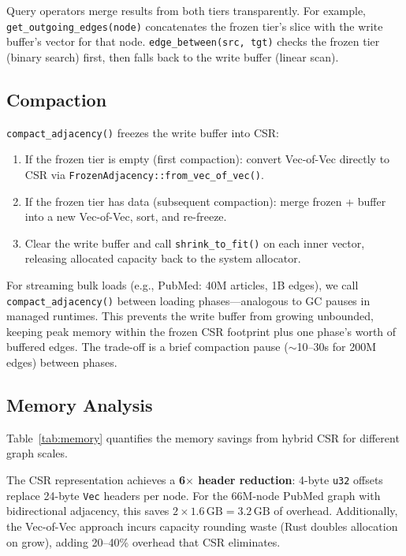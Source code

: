 \documentclass[sigconf, nonacm]{acmart}
\begin{document}
\noindent
Query operators merge results from both tiers transparently.
For example, \texttt{get\_outgoing\_edges(node)} concatenates the frozen tier's slice with the write buffer's vector for that node.
\texttt{edge\_between(src, tgt)} checks the frozen tier (binary search) first, then falls back to the write buffer (linear scan).

\subsection{Compaction}

\texttt{compact\_adjacency()} freezes the write buffer into CSR:

\begin{enumerate}[leftmargin=*]
  \item If the frozen tier is empty (first compaction): convert Vec-of-Vec directly to CSR via \texttt{FrozenAdjacency::from\_vec\_of\_vec()}.
  \item If the frozen tier has data (subsequent compaction): merge frozen + buffer into a new Vec-of-Vec, sort, and re-freeze.
  \item Clear the write buffer and call \texttt{shrink\_to\_fit()} on each inner vector, releasing allocated capacity back to the system allocator.
\end{enumerate}

\noindent
For streaming bulk loads (e.g., PubMed: 40M articles, 1B edges), we call \texttt{compact\_adjacency()} between loading phases---analogous to GC pauses in managed runtimes.
This prevents the write buffer from growing unbounded, keeping peak memory within the frozen CSR footprint plus one phase's worth of buffered edges.
The trade-off is a brief compaction pause (${\sim}$10--30s for 200M edges) between phases.

\subsection{Memory Analysis}

Table~\ref{tab:memory} quantifies the memory savings from hybrid CSR for different graph scales.

The CSR representation achieves a \textbf{6$\times$ header reduction}: 4-byte \texttt{u32} offsets replace 24-byte \texttt{Vec} headers per node.
For the 66M-node PubMed graph with bidirectional adjacency, this saves $2 \times 1.6\,\text{GB} = 3.2\,\text{GB}$ of overhead.
Additionally, the Vec-of-Vec approach incurs capacity rounding waste (Rust doubles allocation on grow), adding 20--40\% overhead that CSR eliminates.
\end{document}
